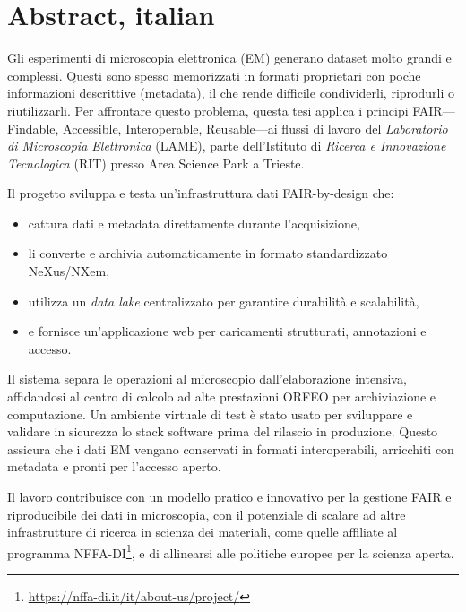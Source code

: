 \chapter{Abstract, italian}

Gli esperimenti di microscopia elettronica (EM) generano dataset molto grandi e complessi. 
Questi sono spesso memorizzati in formati proprietari con poche informazioni descrittive (metadata), 
il che rende difficile condividerli, riprodurli o riutilizzarli.  
Per affrontare questo problema, questa tesi applica i principi FAIR---Findable, Accessible, Interoperable, Reusable---ai flussi di lavoro del \textit{Laboratorio di Microscopia Elettronica} (LAME), parte dell’Istituto di \textit{Ricerca e Innovazione Tecnologica} (RIT) presso Area Science Park a Trieste.

Il progetto sviluppa e testa un’infrastruttura dati FAIR-by-design che:
\begin{itemize}
	\item cattura dati e metadata direttamente durante l’acquisizione,
	\item li converte e archivia automaticamente in formato standardizzato NeXus/NXem,
	\item utilizza un \textit{data lake} centralizzato per garantire durabilità e scalabilità,
	\item e fornisce un’applicazione web per caricamenti strutturati, annotazioni e accesso.
\end{itemize}

Il sistema separa le operazioni al microscopio dall’elaborazione intensiva, 
affidandosi al centro di calcolo ad alte prestazioni ORFEO per archiviazione e computazione.  
Un ambiente virtuale di test è stato usato per sviluppare e validare in sicurezza lo stack software prima del rilascio in produzione.  
Questo assicura che i dati EM vengano conservati in formati interoperabili, arricchiti con metadata e pronti per l’accesso aperto.

Il lavoro contribuisce con un modello pratico e innovativo per la gestione FAIR e riproducibile dei dati in microscopia, 
con il potenziale di scalare ad altre infrastrutture di ricerca in scienza dei materiali, come quelle affiliate al programma NFFA-DI\footnote{\url{https://nffa-di.it/it/about-us/project/}}, 
e di allinearsi alle politiche europee per la scienza aperta.
